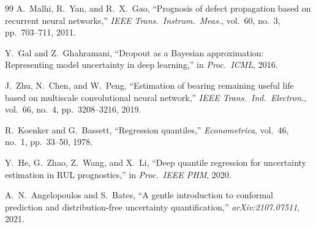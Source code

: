 \documentclass[12pt,a4paper]{report}
\begin{document}
\begin{thebibliography}{99}
A.~Malhi, R.~Yan, and R.~X.~Gao,
\newblock ``Prognosis of defect propagation based on recurrent neural networks,''
\newblock \textit{IEEE Trans.\ Instrum.\ Meas.}, vol.~60, no.~3, pp.~703--711, 2011.

Y.~Gal and Z.~Ghahramani,
\newblock ``Dropout as a Bayesian approximation: Representing model uncertainty in deep learning,''
\newblock in \textit{Proc.\ ICML}, 2016.

J.~Zhu, N.~Chen, and W.~Peng,
\newblock ``Estimation of bearing remaining useful life based on multiscale convolutional neural network,''
\newblock \textit{IEEE Trans.\ Ind.\ Electron.}, vol.~66, no.~4, pp.~3208--3216, 2019.

R.~Koenker and G.~Bassett,
\newblock ``Regression quantiles,''
\newblock \textit{Econometrica}, vol.~46, no.~1, pp.~33--50, 1978.

Y.~He, G.~Zhao, Z.~Wang, and X.~Li,
\newblock ``Deep quantile regression for uncertainty estimation in RUL prognostics,''
\newblock in \textit{Proc.\ IEEE PHM}, 2020.

A.~N.~Angelopoulos and S.~Bates,
\newblock ``A gentle introduction to conformal prediction and distribution-free uncertainty quantification,''
\newblock \textit{arXiv:2107.07511}, 2021.

\end{thebibliography}
\end{document}
